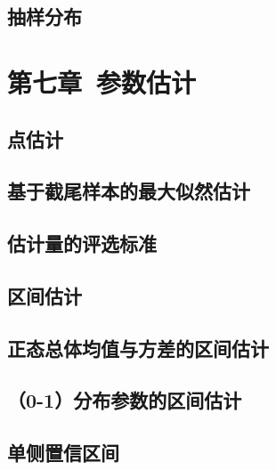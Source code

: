 \documentclass[UTF8]{ctexart}
\begin{document}
	\subsection{抽样分布}
	\section{第七章\ 参数估计}
	\subsection{点估计}
	\subsection{基于截尾样本的最大似然估计}
	\subsection{估计量的评选标准}
	\subsection{区间估计}
	\subsection{正态总体均值与方差的区间估计}
	\subsection{（0-1）分布参数的区间估计}
	\subsection{单侧置信区间}
\end{document}
